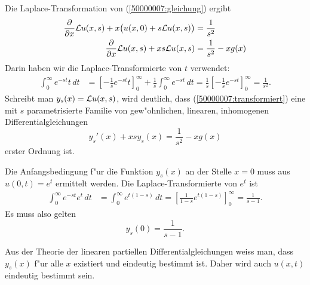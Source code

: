 \begin{loesung}
\begin{teilaufgaben}
\item
Die Laplace-Transformation von (\ref{50000007:gleichung}) ergibt
\begin{align}
\frac{\partial}{\partial x}{\cal L}u(x,s)
+x\bigl(u(x,0)+s{\cal L}u(x,s)\bigr)&=\frac1{s^2}
\notag
\\
\frac{\partial}{\partial x}{\cal L}u(x,s)
+xs{\cal L}u(x,s)&=\frac1{s^2}-xg(x)
\label{50000007:transformiert}
\end{align}
Darin haben wir die Laplace-Transformierte von $t$ verwendet:
\begin{align*}
\int_0^\infty e^{-st}t\,dt
&=
\left[
-\frac1{s} e^{-st}t
\right]_0^\infty
+\frac1s\int_0^\infty e^{-st}\,dt
=\frac1s\left[
-\frac1se^{-st}
\right]_0^\infty=\frac1{s^2}.
\end{align*}
Schreibt man $y_s(x)={\cal L}u(x,s)$, wird deutlich,
dass (\ref{50000007:transformiert}) eine mit $s$ parametrisierte
Familie von gew"ohnlichen, linearen, inhomogenen Differentialgleichungen
\begin{equation}
y_s'(x)+xsy_s(x)=\frac1{s^2}-xg(x)
\label{50000007:family}
\end{equation}
erster Ordnung ist.

Die Anfangsbedingung f"ur die Funktion $y_s(x)$ an der Stelle $x=0$
muss aus $u(0,t)=e^t$ ermittelt werden.
Die Laplace-Transformierte von $e^t$ ist
\begin{align*}
\int_0^\infty e^{-st}e^t\,dt
&=
\int_0^\infty e^{t(1-s)}\,dt
=\left[\frac1{1-s}e^{t(1-s)}\right]_0^\infty=\frac1{s-1}.
\end{align*}
Es muss also gelten
\[
y_s(0)=\frac1{s-1}.
\]
\item
Aus der Theorie der linearen partiellen Differentialgleichungen weiss man,
dass $y_s(x)$ f"ur alle $x$ existiert und eindeutig bestimmt ist. 
Daher wird auch $u(x,t)$ eindeutig bestimmt sein.


\end{teilaufgaben}
\end{loesung}
